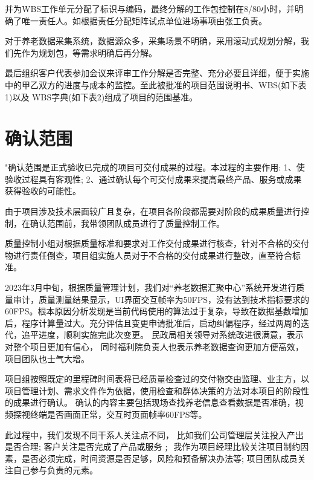 \documentclass[UTF8]{../computerUniverse}
\begin{document}
并为WBS工作单元分配了标识与编码，最终分解的工作包控制在8/80小时，并明确了唯一责任人。如根据责任分配矩阵试点单位进场事项由张工负责。

对于养老数据采集系统，数据源众多，采集场景不明确，采用滚动式规划分解，我们先作为规划包，等需求明确后再分解。

最后组织客户代表参加会议来评审工作分解是否完整、充分必要且详细，便于实施中的甲乙双方的进度与成本的监控。至此被批准的项目范围说明书、WBS(如下表1)以及 WBS字典(如下表2)组成了项目的范围基准。




\section{确认范围}
"确认范围是正式验收已完成的项目可交付成果的过程。本过程的主要作用:
1、使验收过程具有客观性;
2、通过确认每个可交付成果来提高最终产品、服务或成果获得验收的可能性。



由于项目涉及技术层面较广且复杂，在项目各阶段都需要对阶段的成果质量进行控制，在确认范围前，我带领团队成员进行了质量控制工作。

质量控制小组对根据质量标准和要求对工作交付成果进行核查，针对不合格的交付物进行责任倒查，项目组实施人员对于不合格的交付成果进行整改，直至符合标准。

2023年3月中旬，根据质量管理计划，我们对“养老数据汇聚中心”系统开发进行质量审计，质量测量结果显示，UI界面交互帧率为50FPS，没有达到技术指标要求的60FPS。根本原因分析发现是当前代码使用的算法过于复杂，导致在数据基数增加后，程序计算量过大。充分评估且变更申请批准后，启动纠偏程序，经过两周的迭代，追平进度，顺利实施完此次变更。
民政局相关领导对系统改进很满意，表示对整个项目更加有信心，
同时福利院负责人也表示养老数据查询更加方便高效，项目团队也士气大增。



项目组按照既定的里程碑时间表将已经质量检查过的交付物交由监理、业主方，以项目管理计划、需求文件作为依据，使用检查和群体决策的方法对本项目的阶段性的成果进行确认。
确认的内容主要包括现场查找养老信息查看数据是否准确，视频探视终端是否画面正常，交互时页面帧率60FPS等。

此过程中，我们发现不同干系人关注点不同，
比如我们公司管理层关注投入产出是否合理;
客户关注是否完成了产品或服务﹔
我作为项目经理比较关注项目制约因素，是否必须完成，时间资源是否足够，风险和预备解决办法等;
项目团队成员关注自己参与负责的元素。
\end{document}
